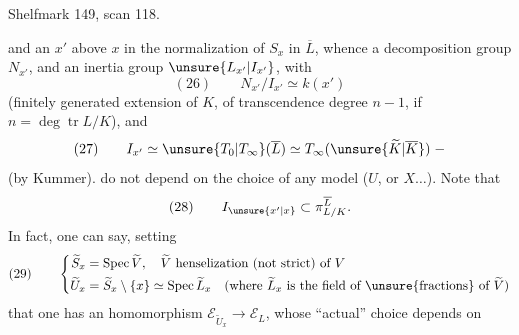 Shelfmark 149, scan 118.

and an $x'$ above $x$ in the normalization of $S_x$ in $\overline L$, whence a decomposition group $N_{x'}$, and an inertia group $\unsure{L_{x'}|I_{x'}}$, with
\[
(26)\qquad N_{x'}/I_{x'}\simeq k(x')
\]
(finitely generated extension of $K$, of transcendence degree $n-1$, if $n=\deg\operatorname{tr}L/K$), and
\[
(27)\qquad I_{x'}\simeq\unsure{T_0|T_\infty}(\overline L)\simeq T_\infty(\unsure{\widetilde K|\overline K})\;-
\]
(by Kummer).   do not depend on the choice of any  model ($U$, or $X\ldots$). Note that
\[
(28)\qquad I_{\unsure{x'|x}}\subset\pi_{L/K}^{\overline L}.
\]
In fact, one can say, setting
\[
(29)\qquad\left\{\begin{aligned}
\widetilde S_x&=\operatorname{Spec}\widetilde V,\quad\widetilde V\text{ henselization (not strict) of }V\\
\widetilde U_x&=\widetilde S_x\setminus\{x\}\simeq\operatorname{Spec}\widetilde L_x\quad(\text{where }\widetilde L_x\text{ is the field of \unsure{fractions} of }\widetilde V)
\end{aligned}\right.
\]
that one has an  homomorphism $\mathcal E_{\widetilde U_x}\longrightarrow\mathcal E_L$,  whose ``actual'' choice depends on
